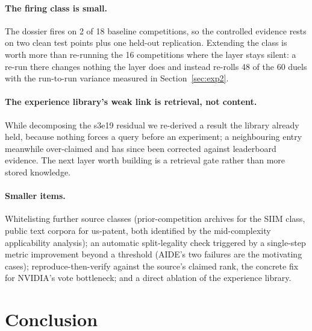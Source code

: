 \documentclass[11pt,a4paper]{article}
\begin{document}
\paragraph{The firing class is small.} The dossier fires on 2 of 18 baseline competitions, so
the controlled evidence rests on two clean test points plus one held-out replication.
Extending the class is worth more than re-running the 16 competitions where the layer stays
silent: a re-run there changes nothing the layer does and instead re-rolls 48 of the 60 duels
with the run-to-run variance measured in Section~\ref{sec:exp2}.

\paragraph{The experience library's weak link is retrieval, not content.} While decomposing
the s3e19 residual we re-derived a result the library already held, because nothing forces a
query before an experiment; a neighbouring entry meanwhile over-claimed and has since been
corrected against leaderboard evidence. The next layer worth building is a retrieval gate
rather than more stored knowledge.

\paragraph{Smaller items.} Whitelisting further source classes (prior-competition archives for
the SIIM class, public text corpora for us-patent, both identified by the mid-complexity
applicability analysis); an automatic split-legality check triggered by a single-step metric
improvement beyond a threshold (AIDE's two failures are the motivating cases); reproduce-then-verify
against the source's claimed rank, the concrete fix for NVIDIA's vote bottleneck; and a direct
ablation of the experience library.

\section{Conclusion}
\end{document}
